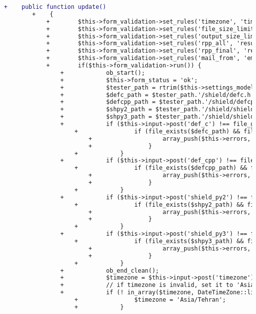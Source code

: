 \begin{lstlisting}[language=diff, caption=Perubahan pada kode Settings.php]
		+    public function update()
		+    {
			+        $this->form_validation->set_rules('timezone', 'timezone', 'required');
			+        $this->form_validation->set_rules('file_size_limit', 'File size limit', 'integer|greater_than_equal_to[0]');
			+        $this->form_validation->set_rules('output_size_limit', 'Output size limit', 'integer|greater_than_equal_to[0]');
			+        $this->form_validation->set_rules('rpp_all', 'results per page (all submissions)', 'integer|greater_than_equal_to[0]');
			+        $this->form_validation->set_rules('rpp_final', 'results per page (final submissions)', 'integer|greater_than_equal_to[0]');
			+        $this->form_validation->set_rules('mail_from', 'email', 'valid_email');
			+        if($this->form_validation->run()) {
				+            ob_start();
				+            $this->form_status = 'ok';
				+            $tester_path = rtrim($this->settings_model->get_setting('tester_path'), '/');
				+            $defc_path = $tester_path.'/shield/defc.h';
				+            $defcpp_path = $tester_path.'/shield/defcpp.h';
				+            $shpy2_path = $tester_path.'/shield/shield_py2.py';
				+            $shpy3_path = $tester_path.'/shield/shield_py3.py';
				+            if ($this->input->post('def_c') !== file_get_contents($defc_path)) {
					+                if (file_exists($defc_path) && file_put_contents($defc_path, $this->input->post('def_c')) === false) {
						+                    array_push($this->errors, 'File defc.h is not writable. Edit it manually.');
						+                }
					+            }
				+            if ($this->input->post('def_cpp') !== file_get_contents($defcpp_path)) {
					+                if (file_exists($defcpp_path) && file_put_contents($defcpp_path, $this->input->post('def_cpp')) === false) {
						+                    array_push($this->errors, 'File defcpp.h is not writable. Edit it manually.');
						+                }
					+            }
				+            if ($this->input->post('shield_py2') !== file_get_contents($shpy2_path)) {
					+                if (file_exists($shpy2_path) && file_put_contents($shpy2_path, $this->input->post('shield_py2')) === false) {
						+                    array_push($this->errors, 'File shield_py2.py is not writable. Edit it manually.');
						+                }
					+            }
				+            if ($this->input->post('shield_py3') !== file_get_contents($shpy3_path)) {
					+                if (file_exists($shpy3_path) && file_put_contents($shpy3_path, $this->input->post('shield_py3')) === false) {
						+                    array_push($this->errors, 'File shield_py3.py is not writable. Edit it manually.');
						+                }
					+            }
				+            ob_end_clean();
				+            $timezone = $this->input->post('timezone');
				+            // if timezone is invalid, set it to 'Asia/Tehran' :
				+            if (! in_array($timezone, DateTimeZone::listIdentifiers())) {
					+                $timezone = 'Asia/Tehran';
					+            }
				

\end{lstlisting}
